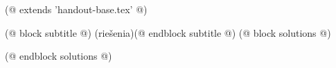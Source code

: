 (@ extends 'handout-base.tex' @)

(@ block subtitle @) (riešenia)(@ endblock subtitle @)
(@ block solutions @)
    
(@ endblock solutions @)
